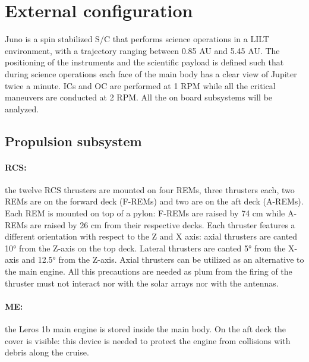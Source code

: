 \section{External configuration}
\label{sec:external_config}

Juno is a spin stabilized S/C that performs science operations in a LILT environment, with a trajectory ranging between 0.85 AU and 5.45 AU. The positioning of the instruments and the scientific payload is defined such that during science operations each face of the main body has a clear view of Jupiter twice a minute. ICs and OC are performed at 1 RPM while all the critical maneuvers are conducted at 2 RPM. All the on board subsystems will be analyzed. 

\subsection{Propulsion subsystem}
\label{subsec:prop_sub}

\paragraph{RCS:}the twelve RCS thrusters are mounted on four REMs, three thrusters each, two REMs are on the forward deck (F-REMs) and two are on the aft deck (A-REMs). 
Each REM is mounted on top of a pylon: F-REMs are raised by 74 cm while A-REMs are raised by 26 cm from their respective decks. Each thruster features a different orientation with respect to the Z and X axis: axial thrusters are canted 10° from the Z-axis on the top deck. Lateral thrusters are canted 5° from the X-axis and 12.5° from the Z-axis. Axial thrusters can be utilized as an alternative to the main engine.  
\mref
All this precautions are needed as plum from the firing of the thruster must not interact nor with the solar arrays nor with the antennas.
\vspace{-4mm}

\paragraph{ME:}the Leros 1b main engine is stored inside the main body. On the aft deck the cover is visible: this device is needed to protect the engine from collisions with debris along the cruise. 

